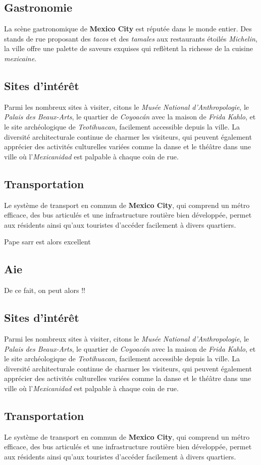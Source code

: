 \documentclass[12pt, a4paper]{article}
\begin{document}
\subsection*{\textbf{Gastronomie}}

La scène gastronomique de \textbf{Mexico City} est réputée dans le monde entier. Des stands de rue proposant des \textit{tacos} et des \textit{tamales} aux restaurants étoilés \textit{Michelin}, la ville offre une palette de saveurs exquises qui reflètent la richesse de la cuisine \textit{mexicaine}.

\subsection*{\textbf{Sites d'intérêt}}

Parmi les nombreux sites à visiter, citons le \textit{Musée National d'Anthropologie}, le \textit{Palais des Beaux-Arts}, le quartier de \textit{Coyoacán} avec la maison de \textit{Frida Kahlo}, et le site archéologique de \textit{Teotihuacan}, facilement accessible depuis la ville.
La diversité architecturale continue de charmer les visiteurs, qui peuvent également apprécier des activités culturelles variées comme la danse et le théâtre dans une ville où l'\textit{Mexicanidad} est palpable à chaque coin de rue. \subsection*{\textbf{Transportation}} Le système de transport en commun de \textbf{Mexico City}, qui comprend un métro efficace, des bus articulés et une infrastructure routière bien développée, permet aux résidents ainsi qu'aux touristes d'accéder facilement à divers quartiers.

Pape sarr est alors excellent
\subsection{Aie}

De ce fait, on peut alors !!

\subsection*{\textbf{Sites d'intérêt}}

Parmi les nombreux sites à visiter, citons le \textit{Musée National d'Anthropologie}, le \textit{Palais des Beaux-Arts}, le quartier de \textit{Coyoacán} avec la maison de \textit{Frida Kahlo}, et le site archéologique de \textit{Teotihuacan}, facilement accessible depuis la ville.
La diversité architecturale continue de charmer les visiteurs, qui peuvent également apprécier des activités culturelles variées comme la danse et le théâtre dans une ville où l'\textit{Mexicanidad} est palpable à chaque coin de rue. \subsection*{\textbf{Transportation}} Le système de transport en commun de \textbf{Mexico City}, qui comprend un métro efficace, des bus articulés et une infrastructure routière bien développée, permet aux résidents ainsi qu'aux touristes d'accéder facilement à divers quartiers.
\end{document}
